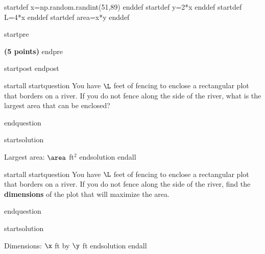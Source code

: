 startdef x=np.random.randint(51,89) enddef
startdef y=2*x enddef
startdef L=4*x enddef
startdef area=x*y enddef

startpre
\item {\bf (5 points)} 
endpre

startpost  
\vfill \vfill \vfill
endpost



startall 
startquestion You have $\L$ feet of fencing to enclose a rectangular plot that borders on a river. If you do not fence along the side of the river, what is the largest area that can be enclosed? \\

endquestion 

startsolution 
\item  Largest area: $\area$ ft$^2$
endsolution 
endall


startall 
startquestion You have $\L$ feet of fencing to enclose a rectangular plot that borders on a river. If you do not fence along the side of the river, find the \textbf{dimensions} of the plot that will maximize the area. \\

endquestion 

startsolution 
\item  Dimensions: $\x$ ft by $\y$ ft
endsolution 
endall


